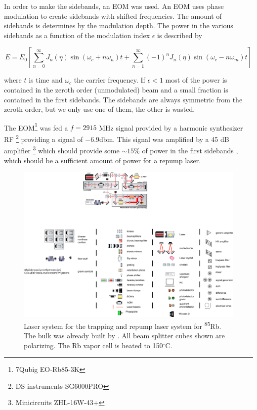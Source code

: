 In order to make the sidebands, an EOM was used. An EOM uses phase modulation to create sidebands with shifted frequencies. The amount of sidebands is determines by the modulation depth. The power in the various sidebands as a function of the modulation index $\epsilon$ is described by \cite{McCarron2008}

\begin{equation}
    E = E_0 \left[
        \sum_{n=0}^{\infty} J_n(\eta)\sin{(\omega_c+n\omega_n)t}+
        \sum_{n=1}^{\infty} (-1)^n J_n(\eta) \sin{(\omega_c-n\omega_m)t}
    \right]
\end{equation}

where $t$ is time and $\omega_c$ the carrier frequency. If $\epsilon <1$ most of the power is contained in the zeroth order (unmodulated) beam and a small fraction is contained in the first sidebands. The sidebands are always symmetric from the zeroth order, but we only use one of them, the other is wasted. 

The EOM\footnote{7Qubig EO-Rb85-3K} was fed a $f = 2915$ MHz signal provided by a harmonic synthesizer RF \footnote{DS instruments SG6000PRO} providing a signal of $-6.9$dbm. This signal was amplified by a 45 dB amplifier \footnote{Minicircuits ZHL-16W-43+} which should provide some $\sim 15$\% of power in the first sidebands \cite{Rens2014}, which should be a sufficient amount of power for a repump laser. 

\begin{figure}
    \centering
    \includegraphics[width=\linewidth]{figures/RbLaserSetup.pdf}
    \caption{Laser system for the trapping and repump laser system for \textsuperscript{85}Rb. The bulk was already built by \cite{Reijnders2010}. All beam splitter cubes shown are polarizing. The Rb vapor cell is heated to 150${^{\circ}}$C.}
    \label{fig:RbLaserSetup}
\end{figure}

